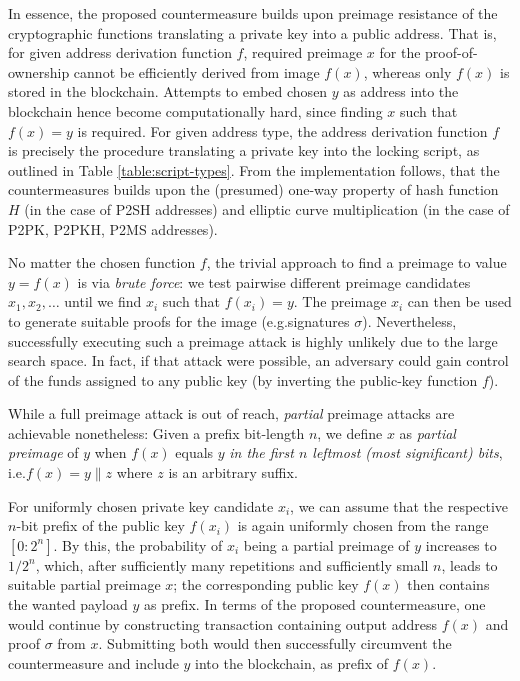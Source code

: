 \documentclass[a4paper,11pt,titlepage]{scrbook}
\begin{document}
In essence, the proposed countermeasure builds upon preimage resistance of the cryptographic functions translating a private key into a public address.
That is, for given address derivation function $f$, required preimage $x$ for the proof-of-ownership cannot be efficiently derived from image $f(x)$, whereas only $f(x)$ is stored in the blockchain.
Attempts to embed chosen $y$ as address into the blockchain hence become computationally hard, since finding $x$ such that $f(x)=y$ is required.
For given address type, the address derivation function $f$ is precisely the procedure translating a private key into the locking script, as outlined in Table \ref{table:script-types}.
From the implementation follows, that the countermeasures builds upon the (presumed) one-way property of hash function $H$ (in the case of P2SH addresses) and elliptic curve multiplication (in the case of P2PK, P2PKH, P2MS addresses).

No matter the chosen function $f$, the trivial approach to find a preimage to value $y=f(x)$ is via \emph{brute force}: we test pairwise different preimage candidates $x_1, x_2, \dots$ until we find $x_i$ such that $f(x_i)=y$.
The preimage $x_i$ can then be used to generate suitable proofs for the image (e.g.\@ signatures $\sigma$).
Nevertheless, successfully executing such a preimage attack is highly unlikely due to the large search space.
In fact, if that attack were possible, an adversary could gain control of the funds assigned to any public key (by inverting the public-key function $f$).

While a full preimage attack is out of reach, \emph{partial} preimage attacks are achievable nonetheless:
Given a prefix bit-length $n$, we define $x$ as \emph{partial preimage} of $y$ when $f(x)$ equals $y$ \emph{in the first $n$ leftmost (most significant) bits}, i.e.\@ $f(x)=y\|z$ where $z$ is an arbitrary suffix.

For uniformly chosen private key candidate $x_i$, we can assume that the respective $n$-bit prefix of the public key $f(x_i)$ is again uniformly chosen from the range $[0{:}2^n]$.
By this, the probability of $x_i$ being a partial preimage of $y$ increases to $1/2^n$, which, after sufficiently many repetitions and sufficiently small $n$, leads to suitable partial preimage $x$; the corresponding public key $f(x)$ then contains the wanted payload $y$ as prefix.
In terms of the proposed countermeasure, one would continue by constructing transaction containing output address $f(x)$ and proof $\sigma$ from $x$.
Submitting both would then successfully circumvent the countermeasure and include $y$ into the blockchain, as prefix of $f(x)$.
\end{document}
